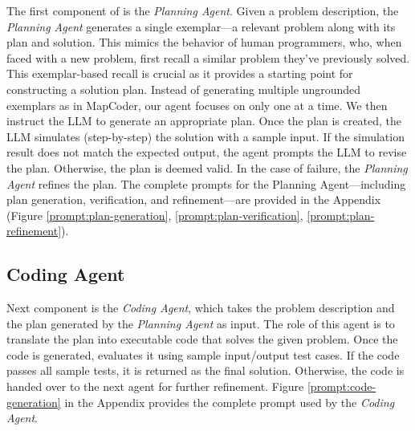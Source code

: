 The first component of \tool is the \emph{Planning Agent}. Given a problem description, the \emph{Planning Agent} generates a single exemplar—a relevant problem along with its plan and solution. This mimics the behavior of human programmers, who, when faced with a new problem, first recall a similar problem they’ve previously solved. This exemplar-based recall is crucial as it provides a starting point for constructing a solution plan. Instead of generating multiple ungrounded exemplars as in MapCoder, our agent focuses on only one at a time. We then instruct the LLM to %
generate an appropriate plan. Once the plan is created, the LLM simulates (step-by-step) the solution with a sample input. If the simulation result does not match the expected output, the agent prompts the LLM to revise the plan. Otherwise, the plan is deemed valid. In the case of failure, the \emph{Planning Agent} refines the plan. The complete prompts for the Planning Agent—including plan generation, verification, and refinement—are provided in the Appendix (Figure \ref{prompt:plan-generation}, 
\ref{prompt:plan-verification}, \ref{prompt:plan-refinement}).
\subsection{Coding Agent}
\label{subsec:coding-agent}

Next component is the \emph{Coding Agent}, which takes the problem description and the plan generated by the \emph{Planning Agent} as input. The role of this agent is to translate the plan into executable code that solves the given problem. Once the code is generated, \tool evaluates it using sample input/output test cases. If the code passes all sample tests, it is returned as the final solution. Otherwise, the code is handed over to the next agent for further refinement. Figure \ref{prompt:code-generation} in the Appendix provides the complete prompt used by the \emph{Coding Agent}.

